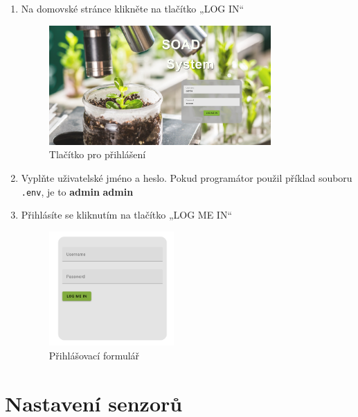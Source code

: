 \documentclass[12pt]{article}
\begin{document}
\begin{teamwork}
        \begin{enumerate}
            \item Na domovské stránce klikněte na tlačítko „LOG IN“
            \begin{figure}[hbt!]
                \centering
                \includegraphics[width=0.8\textwidth]{../../img/main_page}
                \caption{Tlačítko pro přihlášení}
                \label{fig:tlacitko_pro_prih}
            \end{figure}
            \item Vyplňte uživatelské jméno a heslo.
            Pokud programátor použil příklad souboru \texttt{.env}, je to \textbf{admin} \textbf{admin}
            \item Přihlásíte se kliknutím na tlačítko „LOG ME IN“
            \begin{figure}[hbt!]
                \centering
                \includegraphics[width=0.45\textwidth]{../../img/login_box}
                \caption{Přihlášovací formulář}
                \label{fig:login_box}
            \end{figure}
        \end{enumerate}

        \section{Nastavení senzorů}\label{sec:nastaveni-senzoru}


\end{teamwork}
\end{document}
